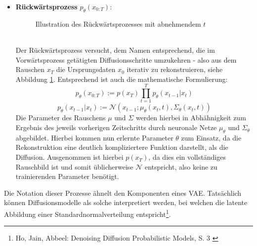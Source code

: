 \begin{itemize}
    \item \textbf{Rückwärtsprozess} $p_\theta(x_{0:T})$: \\
    \begin{figure}[htbp]
        \centering
        \caption{Illustration des Rückwärtsprozesses mit abnehmendem $t$}
        \label{fig:reverse_process}
    \end{figure} \\
    Der Rückwärtsprozess versucht, dem Namen entsprechend, die im Vorwärtsprozess getätigten Diffusionsschritte umzukehren - also aus dem Rauschen $x_T$ die Ursprungsdaten $x_0$ iterativ zu rekonstruieren, siehe Abbildung \ref{fig:reverse_process}. Entsprechend ist auch die mathematische Formulierung:
    \begin{equation}
        p_\theta(x_{0:T}) := p(x_T) \prod_{t=1}^T p_\theta(x_{t-1} | x_{t}) 
    \end{equation}
    \begin{equation}
        p_\theta(x_{t-1} | x_{t})  :=  
        \mathcal N(x_{t-1}; \mu_\theta(x_{t}, t), \Sigma_\theta(x_{t}, t))
    \end{equation}
    Die Parameter des Rauschens $\mu$ und $\Sigma$ werden hierbei in Abhähnigkeit zum Ergebnis des jeweils vorherigen Zeitschritts durch neuronale Netze $\mu_\theta$ und $\Sigma_\theta$ abgebildet. Hierbei kommen nun erlernte Parameter $\theta$ zum Einsatz, da die Rekonstruktion eine deutlich kompliziertere Funktion darstellt, als die Diffusion. Ausgenommen ist hierbei $p(x_T)$, da dies ein vollständiges Rauschbild ist und somit üblicherweise $\mathcal N$ entspricht, also keine zu trainierenden Parameter benötigt.
\end{itemize}
Die Notation dieser Prozesse ähnelt den Komponenten eines \ac{VAE}. Tatsächlich können Diffusionsmodelle als solche interpretiert werden, bei welchen die latente Abbildung einer Standardnormalverteilung entspricht\footnote{
    Ho, Jain, Abbeel: Denoising Diffusion Probabilistic Models, S. 3
    \cite{ho2020denoisingdiffusionprobabilisticmodels}
}.
